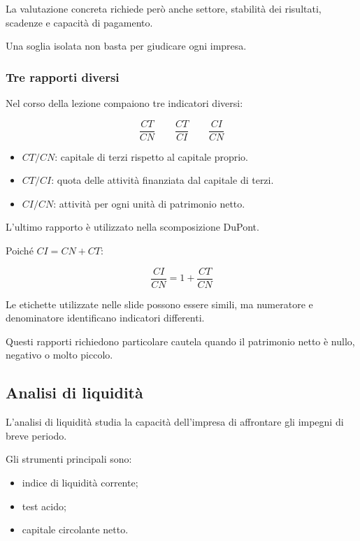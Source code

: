 \noindent La valutazione concreta
richiede però anche settore,
stabilità dei risultati,
scadenze e capacità di pagamento.

\noindent Una soglia isolata
non basta per giudicare ogni impresa.


\subsubsection*{Tre rapporti diversi}

\noindent Nel corso della lezione
compaiono tre indicatori diversi:

\[
\boxed{
\frac{CT}{CN}
}
\qquad
\boxed{
\frac{CT}{CI}
}
\qquad
\boxed{
\frac{CI}{CN}
}
\]

\begin{itemize}
    \item $CT/CN$:
    capitale di terzi rispetto
    al capitale proprio.

    \item $CT/CI$:
    quota delle attività
    finanziata dal capitale di terzi.

    \item $CI/CN$:
    attività per ogni unità
    di patrimonio netto.
\end{itemize}

\noindent L'ultimo rapporto
è utilizzato nella scomposizione DuPont.

\noindent Poiché $CI=CN+CT$:

\[
\boxed{
\frac{CI}{CN}
=
1+\frac{CT}{CN}
}
\]

\noindent Le etichette utilizzate nelle slide
possono essere simili,
ma numeratore e denominatore
identificano indicatori differenti.

\noindent Questi rapporti
richiedono particolare cautela
quando il patrimonio netto
è nullo, negativo o molto piccolo.


\subsection{Analisi di liquidità}

\noindent L'analisi di liquidità
studia la capacità dell'impresa
di affrontare gli impegni
di breve periodo.

\noindent Gli strumenti principali sono:

\begin{itemize}
    \item indice di liquidità corrente;
    \item test acido;
    \item capitale circolante netto.
\end{itemize}


